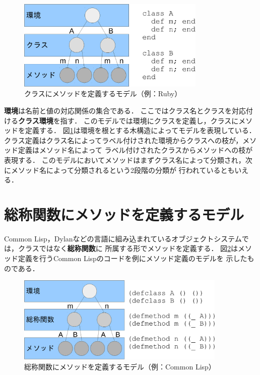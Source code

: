 \documentclass[a4paper,11pt,dvipdfmx]{jreport}
\begin{document}
\begin{figure}[htbp]
	\centering
	\includegraphics[width=9cm]{fig/trees_class-crop.pdf}
	\caption{クラスにメソッドを定義するモデル（例：Ruby）}
	\label{figure:class-model}
\end{figure}

\textbf{環境}は名前と値の対応関係の集合である．
ここではクラス名とクラスを対応付ける\textbf{クラス環境}を指す．
このモデルでは環境にクラスを定義し，クラスにメソッドを定義する．
図\ref{figure:class-model}は環境を根とする木構造によってモデルを表現している．
クラス定義はクラス名によってラベル付けされた環境からクラスへの枝が，メソッド定義はメソッド名によって
ラベル付けされたクラスからメソッドへの枝が表現する．
このモデルにおいてメソッドはまずクラス名によって分類され，次にメソッド名によって分類されるという2段階の分類が
行われているともいえる．

\section{総称関数にメソッドを定義するモデル}

Common Lisp，Dylanなどの言語に組み込まれているオブジェクトシステムでは，クラスではなく\textbf{総称関数}に
所属する形でメソッドを定義する．
図\ref{figure:gf-model}はメソッド定義を行うCommon Lispのコードを例にメソッド定義のモデルを
示したものである．

\begin{figure}[htbp]
	\centering
	\includegraphics[width=10cm]{fig/trees_gf-crop.pdf}
	\caption{総称関数にメソッドを定義するモデル（例：Common Lisp）}
	\label{figure:gf-model}
\end{figure}
\end{document}
